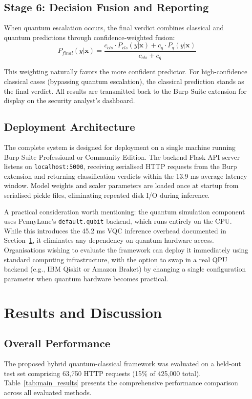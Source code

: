 \documentclass[journal,onecolumn]{IEEEtran}
\begin{document}
\subsection{Stage 6: Decision Fusion and Reporting}
When quantum escalation occurs, the final verdict combines classical and quantum predictions through confidence-weighted fusion:
\begin{equation}
P_{final}(y|\mathbf{x}) = \frac{c_{cls} \cdot P_{cls}(y|\mathbf{x}) + c_q \cdot P_q(y|\mathbf{x})}{c_{cls} + c_q}
\end{equation}

This weighting naturally favors the more confident predictor. For high-confidence classical cases (bypassing quantum escalation), the classical prediction stands as the final verdict. All results are transmitted back to the Burp Suite extension for display on the security analyst's dashboard.

\subsection{Deployment Architecture}
The complete system is designed for deployment on a single machine running Burp Suite Professional or Community Edition. The backend Flask API server listens on \texttt{localhost:5000}, receiving serialised HTTP requests from the Burp extension and returning classification verdicts within the 13.9 ms average latency window. Model weights and scaler parameters are loaded once at startup from serialised pickle files, eliminating repeated disk I/O during inference.

A practical consideration worth mentioning: the quantum simulation component uses PennyLane's \texttt{default.qubit} backend, which runs entirely on the CPU. While this introduces the 45.2 ms VQC inference overhead documented in Section~\ref{sec:results}, it eliminates any dependency on quantum hardware access. Organisations wishing to evaluate the framework can deploy it immediately using standard computing infrastructure, with the option to swap in a real QPU backend (e.g., IBM Qiskit or Amazon Braket) by changing a single configuration parameter when quantum hardware becomes practical.


\section{Results and Discussion}
\label{sec:results}

\subsection{Overall Performance}
The proposed hybrid quantum-classical framework was evaluated on a held-out test set comprising 63,750 HTTP requests (15\% of 425,000 total). Table~\ref{tab:main_results} presents the comprehensive performance comparison across all evaluated methods.
\end{document}
